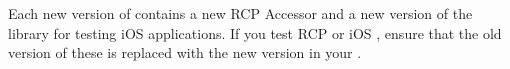 Each new version of \app{} contains a new RCP Accessor and a new version of the library for testing iOS applications. If you test RCP or iOS \gdauts{}, ensure that the old version of these is replaced with the new version in your \gdaut{}.
